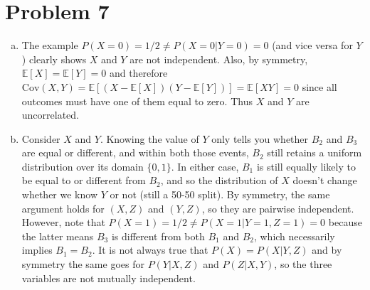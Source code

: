 \documentclass[11pt]{article}
\newcommand{\E}{\mathbb{E}}
\newcommand{\cov}{\text{Cov}}
\newcommand{\asdf}{\newline\newline}
\begin{document}
\section*{Problem 7}
\begin{enumerate}[(a)]
\item The example $P(X=0) = 1/2 \neq P(X=0|Y=0)=0$ (and vice versa for $Y$) clearly shows $X$ and $Y$ are not independent. Also, by symmetry, $\E[X] = \E[Y] = 0$ and therefore $\cov(X,Y)=\E[(X-\E[X])(Y-\E[Y])] = \E[XY] = 0$ since all outcomes must have one of them equal to zero. Thus $X$ and $Y$ are uncorrelated.
\item Consider $X$ and $Y$. Knowing the value of $Y$ only tells you whether $B_2$ and $B_3$ are equal or different, and within both those events, $B_2$ still retains a uniform distribution over its domain $\{0,1\}$. In either case, $B_1$ is still equally likely to be equal to or different from $B_2$, and so the distribution of $X$ doesn't change whether we know $Y$ or not (still a 50-50 split). By symmetry, the same argument holds for $(X,Z)$ and $(Y,Z)$, so they are pairwise independent.\asdf
However, note that $P(X=1)=1/2 \neq P(X=1|Y=1,Z=1)=0$ because the latter means $B_3$ is different from both $B_1$ and $B_2$, which necessarily implies $B_1=B_2$. It is not always true that $P(X)=P(X|Y,Z)$ and by symmetry the same goes for $P(Y|X,Z)$ and $P(Z|X,Y)$, so the three variables are not mutually independent.
\end{enumerate}
\end{document}

